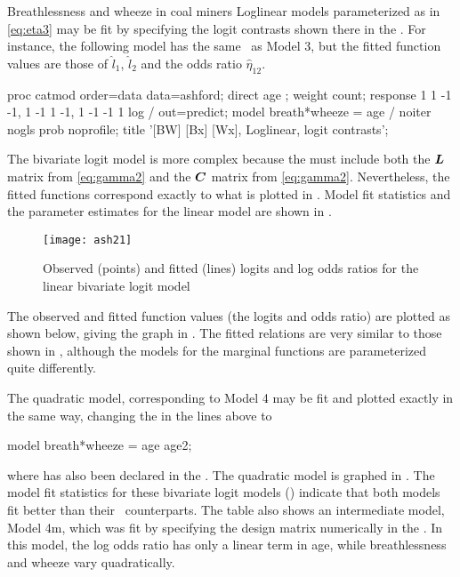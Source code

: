 \begin{Example}[ashford]{Breathlessness and wheeze in coal miners}
Loglinear models parameterized as in \eqref{eq:eta3} may be fit by
specifying the logit contrasts shown there
in the .
For instance, the following model has the same \GSQ\ as
Model 3, but the fitted function values are those of $\hat{l}_1$,
$\hat{l}_2$ and the odds ratio
$\hat{\eta}_{12}$.
\begin{listing}
proc catmod order=data data=ashford;
   direct age ;
   weight count;
   response  1  1 -1 -1,
             1 -1  1 -1,
             1 -1 -1  1  log / out=predict;
   model breath*wheeze = age  /  noiter nogls prob noprofile;
   title '[BW] [Bx] [Wx], Loglinear, logit contrasts';
\end{listing}

The bivariate logit model is more complex because the 
must include both the $\bm{L}$ matrix from \eqref{eq:gamma2} and the $\bm{C}$ matrix from \eqref{eq:gamma2}.
Nevertheless, the fitted functions correspond exactly to
what is plotted in .
Model fit statistics and the parameter estimates for the linear model
are shown in .

\begin{figure}[htb]
  \centering
  \texttt{[image: ash21]}
  \caption[Observed and fitted logits and log odds ratios, linear bivariate model]{Observed (points) and fitted (lines) logits and log odds ratios for  the linear bivariate logit model}%
  \label{fig:ash21}
\end{figure}

The observed and fitted function values (the logits and odds ratio)
are plotted as shown below, giving the graph in .
The fitted relations are very similar to those shown in ,
although the models for the marginal functions are
parameterized quite differently.


The quadratic model, corresponding to Model 4 may be fit and plotted
exactly in the same way, changing the  in the lines above to
\begin{listing}
   model breath*wheeze = age age2;
\end{listing}
where  has also been declared in the .
The quadratic model is graphed in .
The model fit statistics for these bivariate logit models
() indicate that both models fit better than their
\loglin\ counterparts.  The table also shows an intermediate model,
Model 4m, which was fit by specifying the design matrix numerically
in the .  In this model, the log odds ratio has
only a linear term in age, while breathlessness and wheeze vary
quadratically.


\end{Example}
